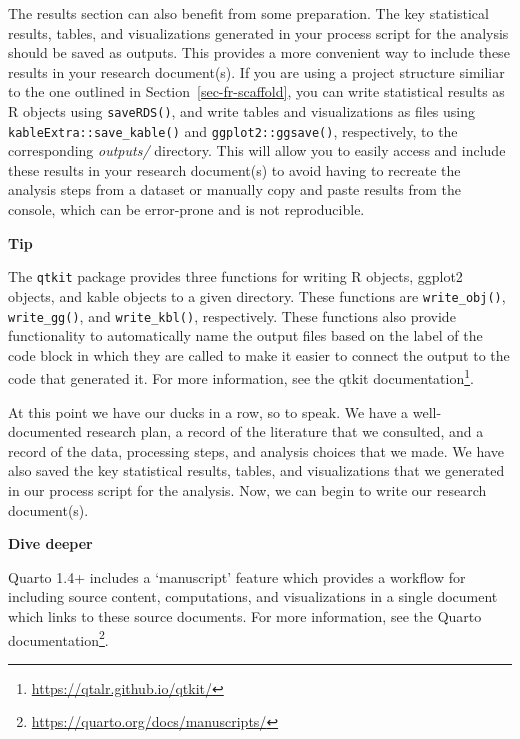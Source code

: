 \documentclass[
  letterpaper,
]{latex/krantz}
\theoremstyle{definition}
\theoremstyle{remark}
\DeclareRobustCommand{\href}[2]{#2\footnote{\url{#1}}}
\begin{document}
The results section can also benefit from some preparation. The key
statistical results, tables, and visualizations generated in your
process script for the analysis should be saved as outputs. This
provides a more convenient way to include these results in your research
document(s). If you are using a project structure similiar to the one
outlined in Section~\ref{sec-fr-scaffold}, you can write statistical
results as R objects using \texttt{saveRDS()}, and write tables and
visualizations as files using \texttt{kableExtra::save\_kable()} and
\texttt{ggplot2::ggsave()}, respectively, to the corresponding
\emph{outputs/} directory. This will allow you to easily access and
include these results in your research document(s) to avoid having to
recreate the analysis steps from a dataset or manually copy and paste
results from the console, which can be error-prone and is not
reproducible.

\begin{tcolorbox}[enhanced jigsaw, colback=white, colframe=quarto-callout-color-frame, leftrule=.75mm, opacityback=0, rightrule=.15mm, bottomrule=.15mm, toprule=.15mm, breakable, left=2mm, arc=.35mm]

\textbf{ Tip}

The \texttt{qtkit} package provides three functions for writing R
objects, ggplot2 objects, and kable objects to a given directory. These
functions are \texttt{write\_obj()}, \texttt{write\_gg()}, and
\texttt{write\_kbl()}, respectively. These functions also provide
functionality to automatically name the output files based on the label
of the code block in which they are called to make it easier to connect
the output to the code that generated it. For more information, see the
\href{https://qtalr.github.io/qtkit/}{qtkit documentation}.

\end{tcolorbox}

At this point we have our ducks in a row, so to speak. We have a
well-documented research plan, a record of the literature that we
consulted, and a record of the data, processing steps, and analysis
choices that we made. We have also saved the key statistical results,
tables, and visualizations that we generated in our process script for
the analysis. Now, we can begin to write our research document(s).

\begin{tcolorbox}[enhanced jigsaw, colback=white, colframe=quarto-callout-color-frame, leftrule=.75mm, opacityback=0, rightrule=.15mm, bottomrule=.15mm, toprule=.15mm, breakable, left=2mm, arc=.35mm]

\textbf{ Dive deeper}

Quarto 1.4+ includes a `manuscript' feature which provides a workflow
for including source content, computations, and visualizations in a
single document which links to these source documents. For more
information, see the \href{https://quarto.org/docs/manuscripts/}{Quarto
documentation}.

\end{tcolorbox}
\end{document}
